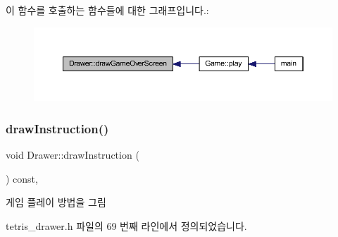 이 함수를 호출하는 함수들에 대한 그래프입니다.\+:
\nopagebreak
\begin{figure}[H]
\begin{center}
\leavevmode
\includegraphics[width=350pt]{class_drawer_a57ec099eb46c93f20d9221a2244dd9a7_icgraph}
\end{center}
\end{figure}
\mbox{\label{class_drawer_a4fb74bcad295250c519bb848dd48b0de}} 
\subsubsection{\texorpdfstring{draw\+Instruction()}{drawInstruction()}}
{\footnotesize\ttfamily void Drawer\+::draw\+Instruction (\begin{DoxyParamCaption}{ }\end{DoxyParamCaption}) const\hspace{0.3cm}{\ttfamily [inline]}, {\ttfamily [private]}}



게임 플레이 방법을 그림 



tetris\+\_\+drawer.\+h 파일의 69 번째 라인에서 정의되었습니다.


